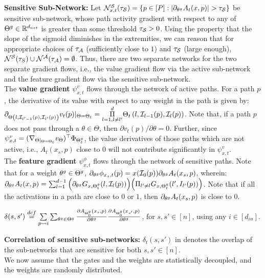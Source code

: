 \textbf{Sensitive Sub-Network:} Let $\N^{\S}_{x,t}(\tau_{\S})=\{p\in[P]: |\partial_{\tg} A_t(x,p)|>\tau_{\S}\}$ be sensitive sub-network, whose path activity gradient with respect to any of $\Tg\inrdnet$ is greater than some threshold $\tau_{\S}>0$. Using the property that the slope of the sigmoid diminishes in the extremities, we can reason that for appropriate choices of $\tau_{\A}$ (sufficiently close to $1$) and $\tau_{\S}$ (large enough), $\N^{\S}(\tau_{S})\cup \N^{\A}(\tau_{\A})=\emptyset$. Thus, there are two separate networks for the two separate gradient flows, i.e., the value gradient flow via the active sub-network and the feature gradient flow via the sensitive sub-network.\\
The \textbf{value gradient}  $\psi^v_{x,t}$ flows through the network of active paths. For a path $p$, the derivative of its value with respect to any weight in the path is given by:
${\partial_{\Theta\left(l,\I_{l'-1}(p),\I_{l'}(p)\right)} v_t(p)}|_{\Theta=\Theta_t}= {\underset{l=1,l\neq l'}{\overset{d}{\Pi}}} \Theta_t\left(l,\I_{l-1}(p),\I_{l}(p)\right)
$.
Note that, if a path $p$ does not pass through a $\theta\in\Theta$, then ${\partial v_t(p)}/{\partial \theta}=0$. Further, since $\psi^v_{x,t}=(\nabla_{\Theta|_{\Theta=\Theta_t}}v_{\Theta})^\top \Phi_{\Tg_t}$, the value derivatives of those paths which are not active, i.e., $A_t(x_s,p)$ close to $0$ will not contribute significantly in $\psi^v_{x,t}$.\\
The \textbf{feature gradient}  $\psi^{\phi}_{x,t}$ flows through the network of sensitive paths. Note that for a weight $\tg\in \Tg$, $\partial_{\tg} \phi_{x_s,t}(p) = x(\I_0(p))\partial_{\tg} A_t(x_s,p)$, wherein:
$
{\partial_{\tg} A_{t}(x,p)}= \sum_{l=1}^{d-1} \Big({\partial_{\tg} G_{x,\Tg_t}(l,\I_l(p))} \Big)\Big(\Pi_{l'\neq l} G_{x,\Tg_t}(l',I_{l'}(p))\Big)
$.
Note that if all the activations in a path are close to $0$ or $1$, then $\partial_{\tg} A_t(x_s,p)$ is close to $0$.\\
\begin{definition}\label{def:delta}
$\delta(s,s')\stackrel{def}= \underset{{p\rsa i}}{\sum} \sum_{\tg\in\Tg}\frac{\partial A_{\Tg_0}(x_s,p)}{\partial \tg} \frac{\partial A_{\Tg_0}(x_{s'},p)}{\partial \tg}$, for $s,s'\in[n]$, using any $i\in[d_{in}]$.
\end{definition}
\textbf{Correlation of sensitive sub-networks:} $\delta_t(s,s')$ in  denotes the overlap of the sub-networks that are sensitive for both $s,s'\in[n]$. \\
We now assume that the gates and the weights are statistically decoupled, and the weights are randomly distributed.
